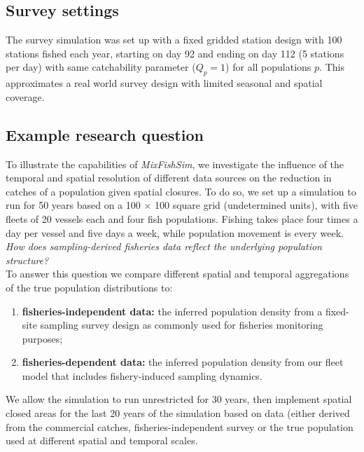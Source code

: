 \documentclass[review]{elsarticle}
\begin{document}
\subsection{Survey settings}

The survey simulation was set up with a fixed gridded station design with 100
stations fished each year, starting on day 92 and ending on day 112 (5 stations
per day) with same catchability parameter ($Q_{p} = 1$) for all populations $p$.
This approximates a real world survey design with limited seasonal and spatial
coverage. 

\subsection{Example research question}

To illustrate the capabilities of \textit{MixFishSim}, we investigate the
influence of the temporal and spatial resolution of different data sources on
the reduction in catches of a population given spatial closures. To do so, we
set up a simulation to run for 50 years based on a 100 $\times$ 100 square grid
(undetermined units), with five fleets of 20 vessels each and four fish
populations. Fishing takes place four times a day per vessel and five days a
week, while population movement is every week. \\

\textit{How does sampling-derived fisheries data reflect the underlying
	population structure?} \\

To answer this question we compare different spatial and temporal aggregations
of the true population distributions to:
\begin{enumerate}[label=\alph*)]
	\item \textbf{fisheries-independent data:} the inferred population
		density from a fixed-site sampling survey design as commonly
		used for
		fisheries monitoring purposes;
	\item \textbf{fisheries-dependent data:} the inferred population
		density from our fleet model that includes fishery-induced
		sampling dynamics.
\end{enumerate}

We allow the simulation to run unrestricted for 30 years, then implement
spatial closed areas for the last 20 years of the simulation based on data
(either derived from the commercial catches, fisheries-independent survey or
the true population used at different spatial and temporal scales. \\
\end{document}
